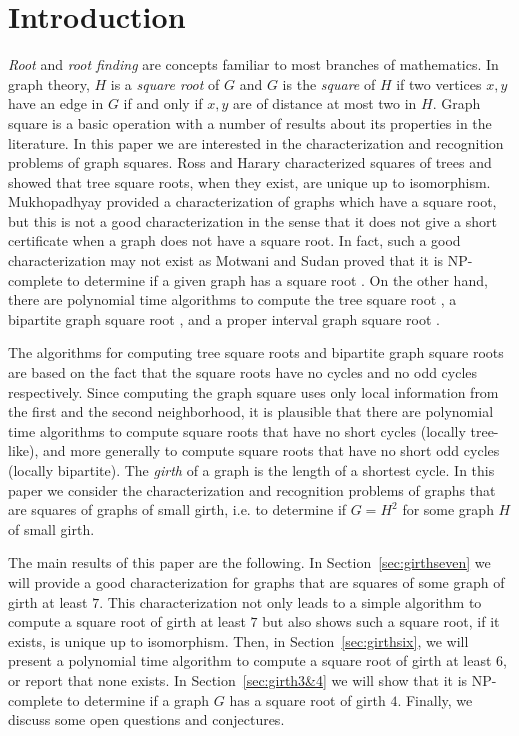 \documentclass[proceedings]{stacs}
\newlength{\ai}
\begin{document}
\maketitle

\section{Introduction}


{\em Root} and {\em root finding} are concepts familiar to most
branches of mathematics.
In graph theory, $H$ is a {\em square root} of $G$
and $G$ is the {\em square} of $H$ if
two vertices $x,y$ have an edge in $G$ if and only if
$x,y$ are of distance at most two in $H$.
Graph square is a basic operation
with a number of results about its properties in the literature. In this paper we are interested in the characterization
and recognition problems of graph squares.
Ross and Harary \cite{RosHar1960} characterized squares of trees and showed
that tree square roots, when they exist, are unique up to isomorphism.
Mukhopadhyay \cite{Muk1967} provided a characterization of graphs which have a
square root, but this is not a good characterization in the sense
that it does not give a short certificate
when a graph does not have a square root.
In fact, such a good characterization may not exist
as Motwani and Sudan proved that it is NP-complete
to determine if a given graph has a square root \cite{MotSud1994}.
On the other hand, there are polynomial time algorithms
to compute the tree square root
\cite{LinSki1995,KeaCor1998,Lau2006,BraLeSri2006,ChaKoLu2006},
a bipartite graph square root \cite{Lau2006},
and a proper interval graph square root \cite{LauCor2004}.

The algorithms for computing tree square roots
and bipartite graph square roots are based on the fact that
the square roots have no cycles and no odd cycles respectively.
Since computing the graph square uses only local information
from the first and the second neighborhood,
it is plausible that there are polynomial time algorithms
to compute square roots that have no short cycles
(locally tree-like), and more generally to compute square roots that
have no short odd cycles (locally bipartite).
The {\em girth} of a graph is the length of a shortest cycle.
In this paper we consider the characterization and recognition
problems of graphs that are squares of graphs of small girth,
i.e. to determine if $G=H^2$ for some graph $H$ of small girth.

The main results of this paper are the following.
In Section~\ref{sec:girthseven} we will provide a good characterization
for graphs that are squares of some graph of girth at least $7$.
This characterization not only leads to a simple algorithm to compute
a square root of girth at least $7$ but also shows such a square root, if it exists, is unique
up to isomorphism.
Then, in Section~\ref{sec:girthsix}, we will present a polynomial time
algorithm to compute a square root of girth at least $6$, or report that none exists.
In Section~\ref{sec:girth3&4} we will show that it is NP-complete to determine if a graph $G$ has
a square root of girth $4$.
Finally, we discuss some open questions and conjectures.
\end{document}
